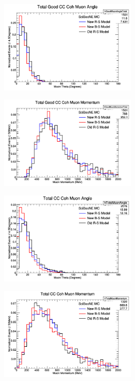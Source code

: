 \documentclass[11pt]{article}
\begin{document}
\begin{figure}[H]
\centering
\includegraphics[width=0.6\textwidth]{NMCombinedPlotsImages/14-NMCombinedPlots.png}
\caption{}
\end{figure}

\begin{figure}[H]
\centering
\includegraphics[width=0.6\textwidth]{NMCombinedPlotsImages/15-NMCombinedPlots.png}
\caption{}
\end{figure}

\begin{figure}[H]
\centering
\includegraphics[width=0.6\textwidth]{NMCombinedPlotsImages/16-NMCombinedPlots.png}
\caption{}
\end{figure}

\begin{figure}[H]
\centering
\includegraphics[width=0.6\textwidth]{NMCombinedPlotsImages/17-NMCombinedPlots.png}
\caption{}
\end{figure}
\end{document}
